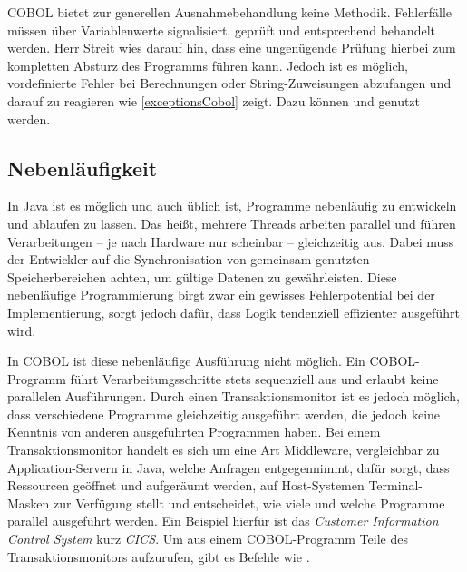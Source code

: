 COBOL bietet zur generellen Ausnahmebehandlung keine Methodik. Fehlerfälle müssen über Variablenwerte signalisiert, geprüft und entsprechend behandelt werden. Herr Streit wies darauf hin, dass eine ungenügende Prüfung hierbei zum kompletten Absturz des Programms führen kann. Jedoch ist es möglich, vordefinierte Fehler bei Berechnungen oder String-Zuweisungen abzufangen und darauf zu reagieren wie \autoref{exceptionsCobol} zeigt. Dazu können  und  genutzt werden.


\subsection{Nebenläufigkeit}

In Java ist es möglich und auch üblich ist, Programme nebenläufig zu entwickeln und ablaufen zu lassen. Das heißt, mehrere Threads arbeiten parallel und führen Verarbeitungen -- je nach Hardware nur scheinbar -- gleichzeitig aus. Dabei muss der Entwickler auf die Synchronisation von gemeinsam genutzten Speicherbereichen achten, um gültige Datenen zu gewährleisten. Diese nebenläufige Programmierung birgt zwar ein gewisses Fehlerpotential bei der Implementierung, sorgt jedoch dafür, dass Logik tendenziell effizienter ausgeführt wird.

In COBOL ist diese nebenläufige Ausführung nicht möglich. Ein COBOL-Programm führt Verarbeitungsschritte stets sequenziell aus und erlaubt keine parallelen Ausführungen. Durch einen Transaktionsmonitor ist es jedoch möglich, dass verschiedene Programme gleichzeitig ausgeführt werden, die jedoch keine Kenntnis von anderen ausgeführten Programmen haben. Bei einem Transaktionsmonitor handelt es sich um eine Art Middleware, vergleichbar zu Application-Servern in Java, welche Anfragen entgegennimmt, dafür sorgt, dass Ressourcen geöffnet und aufgeräumt werden, auf Host-Systemen Terminal-Masken zur Verfügung stellt und entscheidet, wie viele und welche Programme parallel ausgeführt werden. Ein Beispiel hierfür ist das \textit{Customer Information Control System} kurz \textit{CICS}. Um aus einem COBOL-Programm Teile des Transaktionsmonitors aufzurufen, gibt es Befehle wie . 